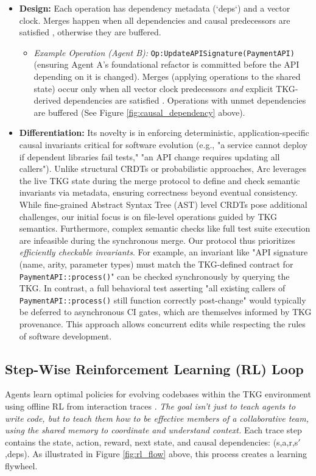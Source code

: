\documentclass{article}
\begin{document}
\begin{itemize}
  \item \textbf{Design:} Each operation has dependency metadata (`deps`) and a vector clock. Merges happen when all dependencies and causal predecessors are satisfied \cite{ref5,ref14,ref15,ref24}, otherwise they are buffered.
      \begin{itemize}
          \item \textit{Example Operation (Agent B):} \verb|Op:UpdateAPISignature(PaymentAPI)| (ensuring Agent A's foundational refactor is committed before the API depending on it is changed). Merges (applying operations to the shared state) occur only when all vector clock predecessors \textit{and} explicit TKG-derived dependencies are satisfied \cite{ref9, ref20, ref21, ref22}. Operations with unmet dependencies are buffered (See Figure \ref{fig:causal_dependency} above).
      \end{itemize}

  \item \textbf{Differentiation:} Its novelty is in enforcing deterministic, application-specific causal invariants critical for software evolution (e.g., "a service cannot deploy if dependent libraries fail tests," "an API change requires updating all callers"). Unlike structural CRDTs or probabilistic approaches, Arc leverages the live TKG state during the merge protocol to define and check semantic invariants via metadata, ensuring correctness beyond eventual consistency.
While fine-grained Abstract Syntax Tree (AST) level CRDTs pose additional challenges, our initial focus is on file-level operations guided by TKG semantics. Furthermore, complex semantic checks like full test suite execution are infeasible during the synchronous merge. Our protocol thus prioritizes \textit{efficiently checkable invariants}. For example, an invariant like "API signature (name, arity, parameter types) must match the TKG-defined contract for \verb|PaymentAPI::process()|" can be checked synchronously by querying the TKG. In contrast, a full behavioral test asserting "all existing callers of \verb|PaymentAPI::process()| still function correctly post-change" would typically be deferred to asynchronous CI gates, which are themselves informed by TKG provenance. This approach allows concurrent edits while respecting the rules of software development.
\end{itemize}

\subsection{Step-Wise Reinforcement Learning (RL) Loop}
Agents learn optimal policies for evolving codebases within the TKG environment using offline RL from interaction traces \cite{ref12, ref19}. \textit{The goal isn't just to teach agents to write code, but to teach them how to be effective members of a collaborative team, using the shared memory to coordinate and understand context.} Each trace step contains the state, action, reward, next state, and causal dependencies: (s,a,r,s$'$,deps). As illustrated in Figure \ref{fig:rl_flow} above, this process creates a learning flywheel.
\end{document}
